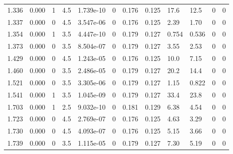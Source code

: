\documentclass[preview]{standalone}
\begin{document}
{{\begin{tabular}{L{1.2cm}C{1.2cm} C{0.3cm}C{0.5cm} C{1.4cm}C{1.4cm} C{1.4cm}C{1.4cm} C{1.6cm}C{1.6cm} C{1.6cm}C{1.6cm}}
  1.336  &  0.000  & 1     & 4.5 &  1.739e-10  & 0  &  0.176&   0.125& 17.6 & 12.5   &  0 & 0  \\ 
  1.337  &  0.000  & 0     & 4.5 &  3.547e-06  & 0  &  0.176&   0.125& 2.39 & 1.70   &  0 & 0  \\ 
  1.354  &  0.000  & 1     & 3.5 &  4.447e-10  & 0  &  0.179&   0.127& 0.754 & 0.536   &  0 & 0  \\ 
  1.373  &  0.000  & 0     & 3.5 &  8.504e-07  & 0  &  0.179&   0.127& 3.55 & 2.53   &  0 & 0  \\ 
  1.429  &  0.000  & 0     & 4.5 &  1.243e-05  & 0  &  0.176&   0.125& 10.0 & 7.15   &  0 & 0  \\ 
  1.460  &  0.000  & 0     & 3.5 &  2.486e-05  & 0  &  0.179&   0.127& 20.2 & 14.4   &  0 & 0  \\ 
  1.521  &  0.000  & 0     & 3.5 &  3.305e-06  & 0  &  0.179&   0.127& 1.15 & 0.822   &  0 & 0  \\ 
  1.541  &  0.000  & 1     & 3.5 &  1.045e-09  & 0  &  0.179&   0.127& 33.4 & 23.8   &  0 & 0  \\ 
  1.703  &  0.000  & 1     & 2.5 &  9.032e-10  & 0  &  0.181&   0.129& 6.38 & 4.54   &  0 & 0  \\ 
  1.723  &  0.000  & 0     & 4.5 &  2.769e-07  & 0  &  0.176&   0.125& 4.63 & 3.29   &  0 & 0  \\ 
  1.730  &  0.000  & 0     & 4.5 &  4.093e-07  & 0  &  0.176&   0.125& 5.15 & 3.66   &  0 & 0  \\ 
  1.739  &  0.000  & 0     & 3.5 &  1.115e-05  & 0  &  0.179&   0.127& 7.30 & 5.19   &  0 & 0  \\ 
\hline 
\end{tabular} 

}}
\end{document}
